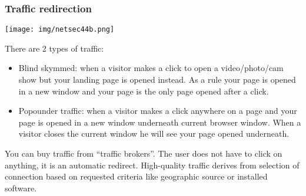 \documentclass[a4paper, 10pt, titlepage]{article}
\begin{document}
\subsubsection*{Traffic redirection}
\begin{center}
	\texttt{[image: img/netsec44b.png]}
\end{center}
There are 2 types of traffic:
\begin{itemize}
	\item Blind skymmed: when a visitor makes a click to open a video/photo/cam show but your landing page is opened instead. As a rule your page is opened in a new window and your page is the only page opened after a click.
	\item Popounder traffic: when a visitor makes a click anywhere on a page and your page is opened in a new window underneath current browser window. When a visitor closes the current window he will see your page opened underneath.
\end{itemize}
You can buy traffic from “traffic brokers”. The user does not have to click on anything, it is an automatic redirect. High-quality traffic derives from selection of connection based on requested criteria like geographic source or installed software.
\end{document}
